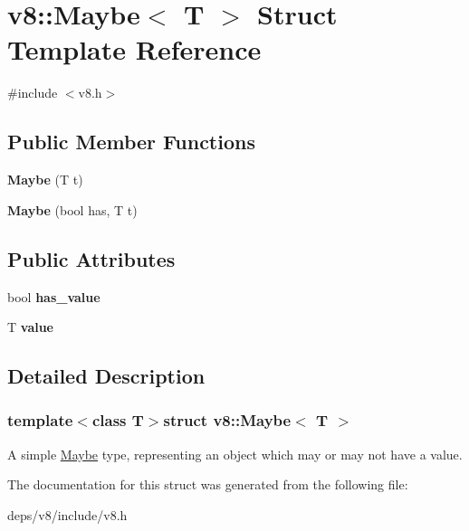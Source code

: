 \hypertarget{structv8_1_1_maybe}{}\section{v8\+:\+:Maybe$<$ T $>$ Struct Template Reference}
\label{structv8_1_1_maybe}


{\ttfamily \#include $<$v8.\+h$>$}

\subsection*{Public Member Functions}
\begin{DoxyCompactItemize}
\item 
\hypertarget{structv8_1_1_maybe_ae2281300d88d2d27681e28bc18535105}{}{\bfseries Maybe} (T t)\label{structv8_1_1_maybe_ae2281300d88d2d27681e28bc18535105}

\item 
\hypertarget{structv8_1_1_maybe_aef0c1b7d8dcab90514924e3e15e31a90}{}{\bfseries Maybe} (bool has, T t)\label{structv8_1_1_maybe_aef0c1b7d8dcab90514924e3e15e31a90}

\end{DoxyCompactItemize}
\subsection*{Public Attributes}
\begin{DoxyCompactItemize}
\item 
\hypertarget{structv8_1_1_maybe_afd7a3ebca6d97a4b87f2829a28723b0b}{}bool {\bfseries has\+\_\+value}\label{structv8_1_1_maybe_afd7a3ebca6d97a4b87f2829a28723b0b}

\item 
\hypertarget{structv8_1_1_maybe_ac3e067a7ae1b5cc92c2f570499db31ea}{}T {\bfseries value}\label{structv8_1_1_maybe_ac3e067a7ae1b5cc92c2f570499db31ea}

\end{DoxyCompactItemize}


\subsection{Detailed Description}
\subsubsection*{template$<$class T$>$struct v8\+::\+Maybe$<$ T $>$}

A simple \hyperlink{structv8_1_1_maybe}{Maybe} type, representing an object which may or may not have a value. 

The documentation for this struct was generated from the following file\+:\begin{DoxyCompactItemize}
\item 
deps/v8/include/v8.\+h\end{DoxyCompactItemize}
